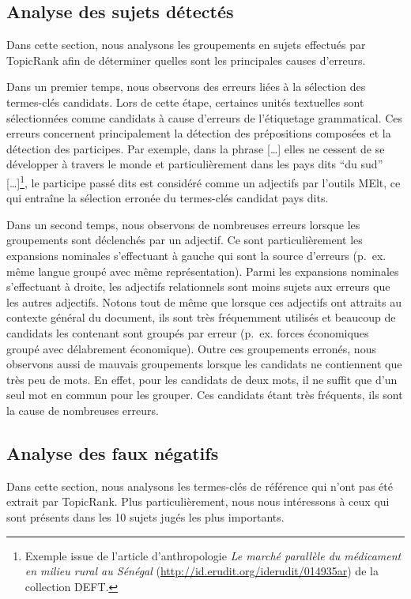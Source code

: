     \subsection{Analyse des sujets détectés}
    \label{subsec:analyse_des_sujets_générés}
      Dans cette section, nous analysons les groupements en sujets effectués par
      TopicRank afin de déterminer quelles sont les principales causes
      d'erreurs.

      Dans un premier temps, nous observons des erreurs liées à la sélection des
      termes-clés candidats. Lors de cette étape, certaines unités textuelles
      sont sélectionnées comme candidats à cause d'erreurs de l'étiquetage
      grammatical. Ces erreurs concernent principalement la détection des
      prépositions composées et la détection des participes. Par exemple, dans
      la phrase \og{}[\dots] elles ne cessent de se développer à travers le
      monde et particulièrement dans les pays dits ``du sud''
      [\dots]\fg{}\footnote{Exemple issue de l'article d'anthropologie
      \textit{Le marché parallèle du médicament en milieu rural au Sénégal}
      (\url{http://id.erudit.org/iderudit/014935ar}) de la collection DEFT.}, le
      participe passé \og{}dits\fg{} est considéré comme un adjectifs par
      l'outils MElt, ce qui entraîne la sélection erronée du termes-clés
      candidat \og{}pays dits\fg{}.

      Dans un second temps, nous observons de nombreuses erreurs lorsque les
      groupements sont déclenchés par un adjectif. Ce sont particulièrement les
      expansions nominales s'effectuant à gauche qui sont la source d'erreurs
      (p.~ex. \og{}même langue\fg{} groupé avec \og{}même représentation\fg{}).
      Parmi les expansions nominales s'effectuant à droite, les adjectifs
      relationnels sont moins sujets aux erreurs que les autres adjectifs.
      Notons tout de même que lorsque ces adjectifs ont attraits au contexte
      général du document, ils sont très fréquemment utilisés et beaucoup de
      candidats les contenant sont groupés par erreur (p.~ex. \og{}forces
      économiques\fg{} groupé avec \og{}délabrement économique\fg{}). Outre ces
      groupements erronés, nous observons aussi de mauvais groupements lorsque
      les candidats ne contiennent que très peu de mots. En effet, pour les
      candidats de deux mots, il ne suffit que d'un seul mot en commun pour les
      grouper. Ces candidats étant très fréquents, ils sont la cause de
      nombreuses erreurs.

    \subsection{Analyse des faux négatifs}
    \label{subsec:analyse_faux_négatifs}
      Dans cette section, nous analysons les termes-clés de référence qui n'ont
      pas été extrait par TopicRank. Plus particulièrement, nous nous
      intéressons à ceux qui sont présents dans les 10 sujets jugés les plus
      importants.

      \TODO{}

